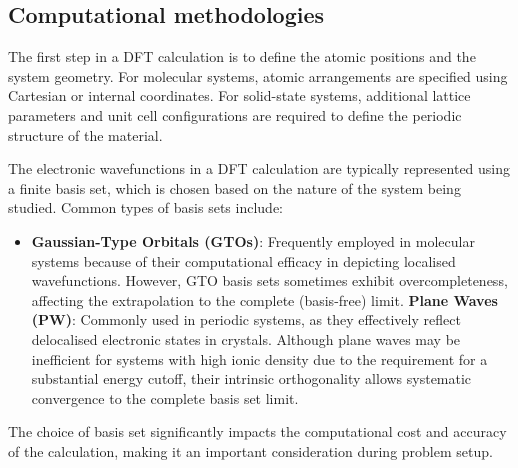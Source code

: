 \subsection{Computational methodologies} \label{sec:2.2.2}
The first step in a DFT calculation is to define the atomic positions and the system geometry.
For molecular systems, atomic arrangements are specified using Cartesian or internal coordinates.
For solid-state systems, additional lattice parameters and unit cell configurations are required to define the periodic structure of the material.
 
The electronic wavefunctions in a DFT calculation are typically represented using a finite basis set, which is chosen based on the nature of the system being studied.
Common types of basis sets include:
\begin{itemize}
    \item[1] \textbf{Gaussian-Type Orbitals (GTOs)}:  Frequently employed in molecular systems because of their computational efficacy in depicting localised wavefunctions.  However, GTO basis sets sometimes exhibit overcompleteness, affecting the extrapolation to the complete (basis-free) limit.
    \textbf{Plane Waves (PW)}:  Commonly used in periodic systems, as they effectively reflect delocalised electronic states in crystals.  Although plane waves may be inefficient for systems with high ionic density due to the requirement for a substantial energy cutoff, their intrinsic orthogonality allows systematic convergence to the complete basis set limit.
\end{itemize}


The choice of basis set significantly impacts the computational cost and accuracy of the calculation, making it an important consideration during problem setup.

